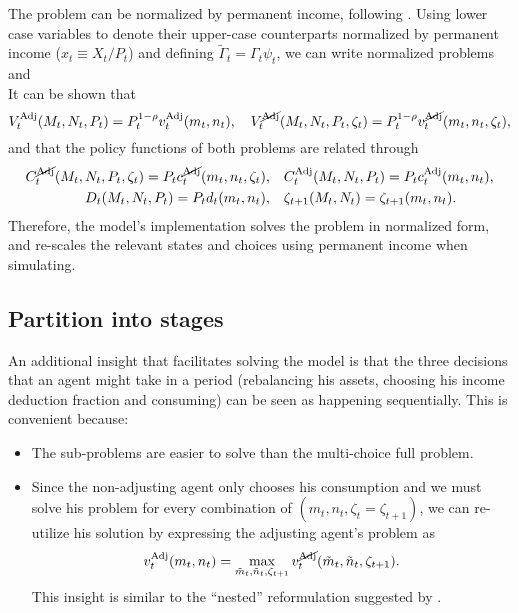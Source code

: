 \documentclass[./RiskyContrib.tex]{subfiles}
\begin{document}
The problem can be normalized by permanent income, following
\cite{Carroll2020solvingmicrodsops}. Using lower case variables to
denote their upper-case counterparts normalized by permanent income ($x_t \equiv X_t/P_t$)
and defining $\tilde{\Gamma}_t = \Gamma_{t}\psi_{t}$, we can write
normalized problems
\begin{equation}\label{eq:bellman_NAdj_norm}

\end{equation}
and
\begin{equation*}

\end{equation*}
It can be shown that
\begin{equation*}
V_{t}^{\text{Adj}}(M_t,N_t,P_t) = P_t^{1-\rho} v_{t}^{\text{Adj}}(m_t,n_t), \quad
V_{t}^{\cancel{\text{Adj}}}(M_t,N_t,P_t,\zeta_t) = P_t^{1-\rho} v_{t}^{\cancel{\text{Adj}}}(m_t,n_t,\zeta_t),
\end{equation*}
and that the policy functions of both problems are related through
\begin{equation*}
\begin{split}
C_t^{\cancel{\text{Adj}}}(M_t,N_t,P_t,\zeta_t) = P_t c_t^{\cancel{\text{Adj}}}(m_t,n_t,\zeta_t),& \quad C_t^{\text{Adj}}(M_t,N_t,P_t) = P_t c_t^{\text{Adj}}(m_t,n_t),\\
D_t(M_t,N_t,P_t) = P_t d_t(m_t,n_t),& \quad \zeta_{t+1}(M_t,N_t) = \zeta_{t+1}(m_t,n_t).
\end{split}
\end{equation*}
Therefore, the model's implementation solves the problem in normalized form, and re-scales
the relevant states and choices using permanent income when simulating.

\subsection{Partition into stages}

An additional insight that facilitates solving the model is that the three decisions
that an agent might take in a period (rebalancing his assets, choosing his income
deduction fraction and consuming) can be seen as happening sequentially. This is
convenient because:
\begin{itemize}
\item The sub-problems are easier to solve than the multi-choice full problem.
\item Since the non-adjusting agent only chooses his consumption and we must
solve his problem for every combination of $(m_t, n_t, \zeta_t=\zeta_{t+1})$, we can re-utilize
his solution by expressing the adjusting agent's  problem as
\begin{equation*}
v_t^{\text{Adj}}(m_t,n_t) = \max_{\tilde{m}_t, \tilde{n}_t, \zeta_{t+1}} v_t^{\cancel{\text{Adj}}}(\tilde{m}_t, \tilde{n}_t, \zeta_{t+1}).
\end{equation*}
This insight is similar to the ``nested'' reformulation suggested by \cite{Druedahl2020compecon}.
\end{itemize}
\end{document}
